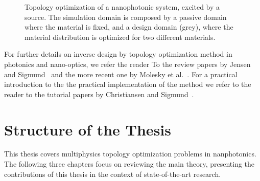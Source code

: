 \begin{figure}[tb]
    \centering
    \caption{Topology optimization of a nanophotonic system, excited by a source. The simulation domain is composed by a passive domain where the material is fixed, and a design domain (grey), where the material distribution is optimized for two different materials.}
        \label{fig:top_opt}
\end{figure}

For further details on inverse design by topology optimization method in photonics and nano-optics, we refer the reader To
the review papers by Jensen and Sigmund~\cite{jensen_review} and the more recent one by Molesky et al.~\cite{Molesky_2018}. 
For a practical introduction to the
the practical implementation of the method we refer to the reader to the tutorial papers 
by Christiansen and Sigmund~\cite{tutorial_matlab, tutorial_COMSOL}.  

\section{Structure of the Thesis}

This thesis covers multiphysics topology optimization problems in nanphotonics. The following three chapters focus on reviewing the main theory, presenting 
the contributions of this thesis in the context of state-of-the-art research.

